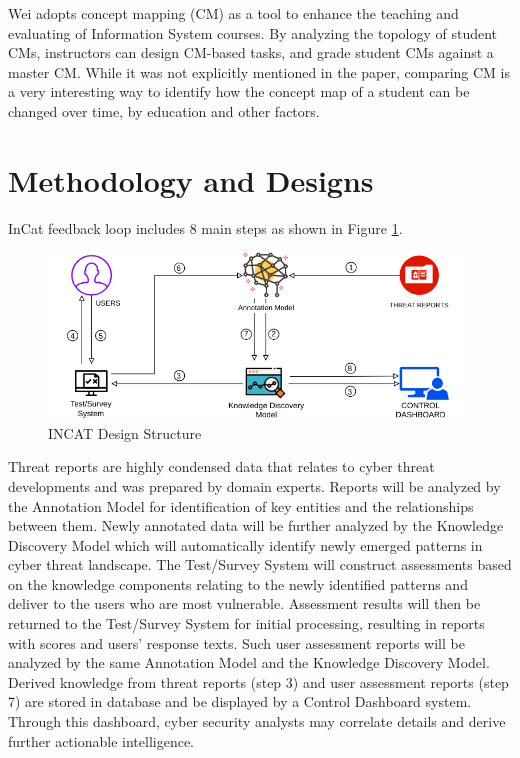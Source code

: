 \documentclass{article} %
\begin{document}
Wei \cite{Wei2017IntegratingAssessment} adopts concept mapping (CM) as a tool to enhance the teaching and evaluating of Information System courses. By analyzing the topology of student CMs, instructors can design CM-based tasks, and grade student CMs against a master CM. While it was not explicitly mentioned in the paper, comparing CM is a very interesting way to identify how the concept map of a student can be changed over time, by education and other factors.

\section{Methodology and Designs}
InCat feedback loop includes 8 main steps as shown in Figure \ref{Figure:IncatDesign}. 

\begin{figure}[h]
  \centering
  \includegraphics[width=11cm]{images/INCAT-Designs.png}
  \caption{INCAT Design Structure}
  \label{Figure:IncatDesign}
\end{figure}

Threat reports are highly condensed data that relates to cyber threat developments and was prepared by domain experts. Reports will be analyzed by the Annotation Model for identification of key entities and the relationships between them. Newly annotated data will be further analyzed by the Knowledge Discovery Model which will automatically identify newly emerged patterns in cyber threat landscape. The Test/Survey System will construct assessments based on the knowledge components relating to the newly identified patterns and deliver to the users who are most vulnerable. Assessment results will then be returned to the Test/Survey System for initial processing, resulting in reports with scores and users' response texts. Such user assessment reports will be analyzed by the same Annotation Model and the Knowledge Discovery Model. Derived knowledge from threat reports (step 3) and user assessment reports (step 7) are stored in database and be displayed by a Control Dashboard system. Through this dashboard, cyber security analysts may correlate details and derive further actionable intelligence.
\end{document}
